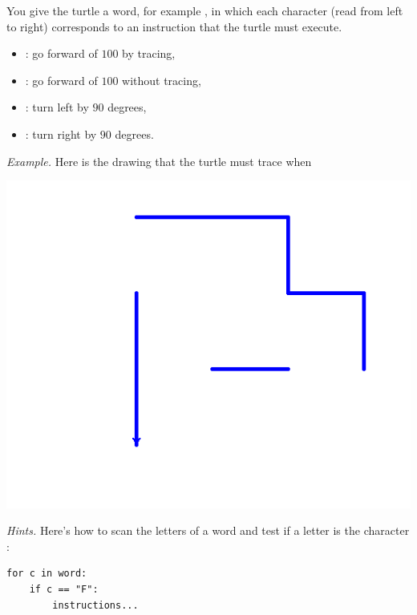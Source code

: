 \documentclass[11pt,class=report,crop=false]{standalone}
\begin{document}
\begin{activite}


You give the \Python{} turtle a word, for example 
, in which each character (read from left to right) corresponds to an instruction that the turtle must execute.

\begin{itemize}
  \item {} : go forward of $100$ by tracing,
  \item {} : go forward of $100$ without tracing,  
  \item {} : turn left by $90$ degrees,
  \item {} : turn right by $90$ degrees.
\end{itemize}

\emph{Example.}
Here is the drawing that the turtle must trace when

\begin{center}
\includegraphics[scale=\myscale,scale=0.4]{screen-ifthen-2}
\end{center}

\emph{Hints.}
Here's how to scan the letters of a word and test if a letter is the character :
\begin{center}
\begin{minipage}{0.5\textwidth}
\begin{lstlisting}
for c in word:
    if c == "F":
        instructions...
\end{lstlisting}
\end{minipage} 
\end{center} 

   
\end{activite}
\end{document}
